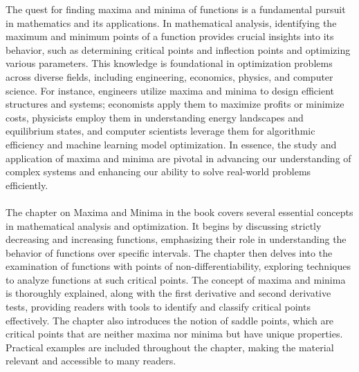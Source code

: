 The quest for finding maxima and minima of functions is a fundamental pursuit in mathematics and its applications. In mathematical analysis, identifying the maximum and minimum points of a function provides crucial insights into its behavior, such as determining critical points and inflection points and optimizing various parameters. This knowledge is foundational in optimization problems across diverse fields, including engineering, economics, physics, and computer science. For instance, engineers utilize maxima and minima to design efficient structures and systems; economists apply them to maximize profits or minimize costs, physicists employ them in understanding energy landscapes and equilibrium states, and computer scientists leverage them for algorithmic efficiency and machine learning model optimization. In essence, the study and application of maxima and minima are pivotal in advancing our understanding of complex systems and enhancing our ability to solve real-world problems efficiently.\\\\


The chapter on Maxima and Minima in the book covers several essential concepts in mathematical analysis and optimization. It begins by discussing strictly decreasing and increasing functions, emphasizing their role in understanding the behavior of functions over specific intervals. The chapter then delves into the examination of functions with points of non-differentiability, exploring techniques to analyze functions at such critical points. The concept of maxima and minima is thoroughly explained, along with the first derivative and second derivative tests, providing readers with tools to identify and classify critical points effectively. The chapter also introduces the notion of saddle points, which are critical points that are neither maxima nor minima but have unique properties. Practical examples are included throughout the chapter, making the material relevant and accessible to many readers.